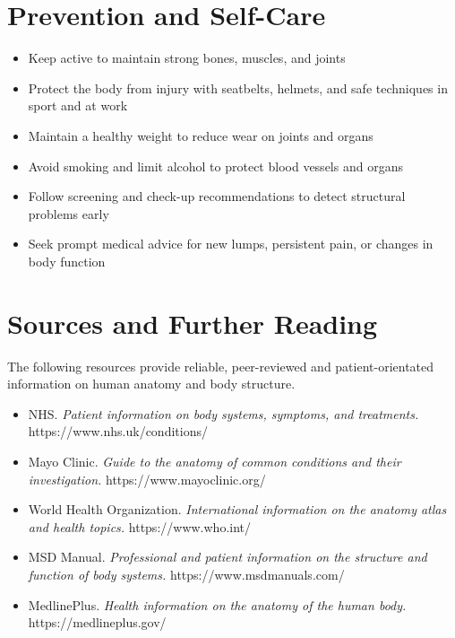 \section*{Prevention and Self-Care}
\begin{itemize}
    \item Keep active to maintain strong bones, muscles, and joints
    \item Protect the body from injury with seatbelts, helmets, and safe techniques in sport and at work
    \item Maintain a healthy weight to reduce wear on joints and organs
    \item Avoid smoking and limit alcohol to protect blood vessels and organs
    \item Follow screening and check-up recommendations to detect structural problems early
    \item Seek prompt medical advice for new lumps, persistent pain, or changes in body function
\end{itemize}

\section*{Sources and Further Reading}
The following resources provide reliable, peer-reviewed and patient-orientated information on human anatomy and body structure.

\begin{itemize}
    \item NHS. \textit{Patient information on body systems, symptoms, and treatments.} https://www.nhs.uk/conditions/
    \item Mayo Clinic. \textit{Guide to the anatomy of common conditions and their investigation.} https://www.mayoclinic.org/
    \item World Health Organization. \textit{International information on the anatomy atlas and health topics.} https://www.who.int/
    \item MSD Manual. \textit{Professional and patient information on the structure and function of body systems.} https://www.msdmanuals.com/
    \item MedlinePlus. \textit{Health information on the anatomy of the human body.} https://medlineplus.gov/
\end{itemize}
